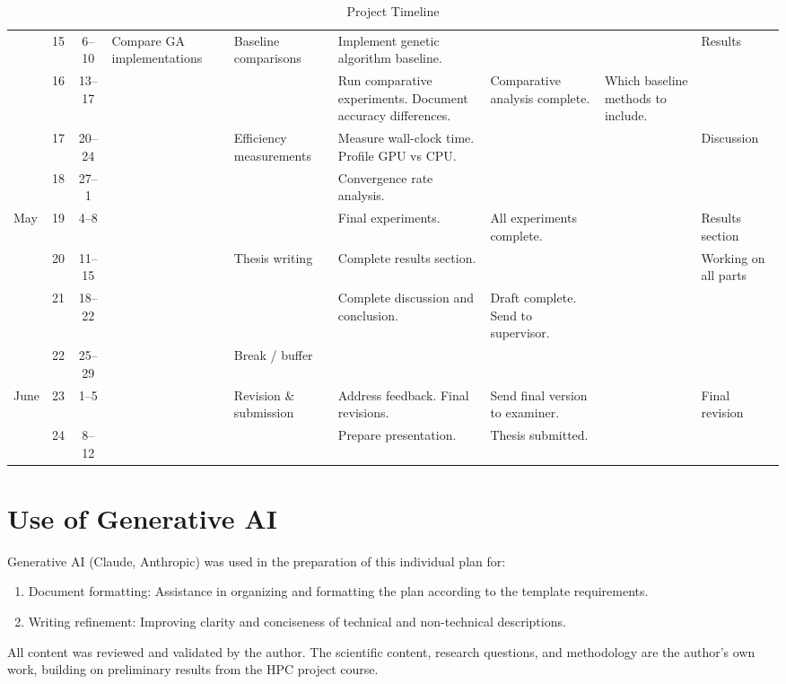 \documentclass{article}
\begin{document}
\begin{table}[ht]
\begin{tabular}{|p{1.1cm}|c|c|p{2.2cm}|p{2.2cm}|p{2.2cm}|p{2.2cm}|p{2.2cm}|p{2.2cm}|}
& 15 & 6--10 & \multirow{2}{*}{\parbox{2.2cm}{Compare GA implementations}} & \multirow{2}{*}{\parbox{2.2cm}{Baseline comparisons}} & Implement genetic algorithm baseline. & & & \multirow{2}{*}{Results} \\
\cline{2-3}\cline{6-8}
& 16 & 13--17 & & & Run comparative experiments. Document accuracy differences. & Comparative analysis complete. & Which baseline methods to include. & \\
\cline{2-9}
& 17 & 20--24 & & \multirow{3}{*}{\parbox{2.2cm}{Efficiency measurements}} & Measure wall-clock time. Profile GPU vs CPU. & & & \multirow{2}{*}{Discussion} \\
\cline{2-4}\cline{6-8}
& 18 & 27--1 & & & Convergence rate analysis. & & & \\
\hline
\multirow{4}{*}{May}
& 19 & 4--8 & & & Final experiments. & All experiments complete. & & Results section \\
\cline{2-9}
& 20 & 11--15 & & \multirow{2}{*}{\parbox{2.2cm}{Thesis writing}} & Complete results section. & & & \multirow{2}{*}{\parbox{2.2cm}{Working on all parts}} \\
\cline{2-4}\cline{6-8}
& 21 & 18--22 & & & Complete discussion and conclusion. & Draft complete. Send to supervisor. & & \\
\cline{2-9}
& 22 & 25--29 & & Break / buffer & & & & \\
\hline
\multirow{2}{*}{June}
& 23 & 1--5 & & \multirow{2}{*}{\parbox{2.2cm}{Revision \& submission}} & Address feedback. Final revisions. & Send final version to examiner. & & Final revision \\
\cline{2-4}\cline{6-9}
& 24 & 8--12 & & & Prepare presentation. & Thesis submitted. & & \\
\hline
\end{tabular}
\caption{Project Timeline}
\label{tab:timeline}
\end{table}

\section{Use of Generative AI}

Generative AI (Claude, Anthropic) was used in the preparation of this individual plan for:

\begin{enumerate}
    \item Document formatting: Assistance in organizing and formatting the plan according to the template requirements.
    \item Writing refinement: Improving clarity and conciseness of technical and non-technical descriptions.
\end{enumerate}

All content was reviewed and validated by the author.
The scientific content, research questions, and methodology are the author's own work, building on preliminary results from the HPC project course.

\printbibliography
\end{document}
